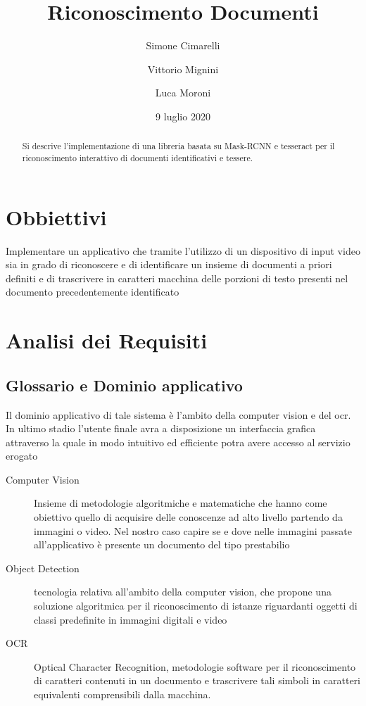 \documentclass[12pt,a4paper]{article}
\begin{document}
\title{Riconoscimento Documenti}
\author{Simone Cimarelli \and Vittorio Mignini \and Luca Moroni}
\date{9 luglio 2020}

\maketitle

\begin{abstract}
    Si descrive l'implementazione di una libreria basata su Mask-RCNN e
    tesseract per il riconoscimento interattivo di documenti
    identificativi e tessere.
\end{abstract}

\section{Obbiettivi}

Implementare un applicativo che tramite l'utilizzo di un dispositivo di input video sia in
grado di riconoscere e di identificare un insieme di documenti a priori definiti
e di trascrivere in caratteri macchina delle porzioni di testo presenti nel documento precedentemente identificato

\section{Analisi dei Requisiti}
\subsection{Glossario e Dominio applicativo}

Il dominio applicativo di tale sistema è l'ambito della computer vision e del ocr.
In ultimo stadio l'utente finale avra a disposizione un interfaccia grafica attraverso la quale
in modo intuitivo ed efficiente potra avere accesso al servizio erogato 

\begin{description}

    \item[Computer Vision] Insieme di metodologie algoritmiche e matematiche che hanno come obiettivo
    quello di acquisire delle conoscenze ad alto livello partendo da immagini o video. Nel nostro caso 
    capire se e dove nelle immagini passate all'applicativo è presente un documento del tipo prestabilio

    \item[Object Detection] tecnologia relativa all'ambito della computer vision, che propone una soluzione
    algoritmica per il riconoscimento di istanze riguardanti oggetti di classi predefinite in immagini digitali e video

    \item[OCR] Optical Character Recognition, metodologie software per il riconoscimento di caratteri contenuti in un documento
    e trascrivere tali simboli in caratteri equivalenti comprensibili dalla macchina.

\end{description}
\end{document}
